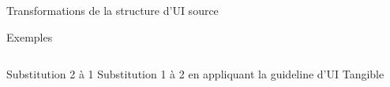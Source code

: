 \documentclass[11pt]{beamer}
\begin{document}
\begin{frame}[t]{ Transformations de la structure d'UI source}
\begin{block}{{\scriptsize Exemples}}
\begin{columns}
\begin{column}{.3\textwidth}
 {{\tiny Substitution 2 à 1 }}
 {{\tiny Substitution 1 à 2 en appliquant la guideline d'UI Tangible}}
\end{column}
\begin{column}{.7\textwidth}  
\end{column}
\end{columns} 

\end{block}
\end{frame}
\end{document}
